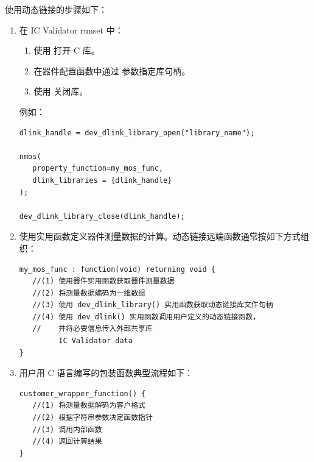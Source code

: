 使用动态链接的步骤如下：
\begin{enumerate}
  \item 在 IC Validator runset 中：
  \begin{enumerate}
    \item 使用  打开 C 库。
    \item 在器件配置函数中通过  参数指定库句柄。
    \item 使用  关闭库。
  \end{enumerate}
  例如：
\begin{lstlisting}[style=pxl]
dlink_handle = dev_dlink_library_open("library_name");

nmos(
   property_function=my_mos_func,
   dlink_libraries = {dlink_handle}
);

dev_dlink_library_close(dlink_handle);
\end{lstlisting}

  \item 使用实用函数定义器件测量数据的计算。动态链接远端函数通常按如下方式组织：
\begin{lstlisting}[style=pxl]
my_mos_func : function(void) returning void {
   //(1) 使用器件实用函数获取器件测量数据
   //(2) 将测量数据编码为一维数组
   //(3) 使用 dev_dlink_library() 实用函数获取动态链接库文件句柄
   //(4) 使用 dev_dlink() 实用函数调用用户定义的动态链接函数，
   //    并将必要信息传入外部共享库
         IC Validator data
}
\end{lstlisting}

  \item 用户用 C 语言编写的包装函数典型流程如下：
\begin{lstlisting}[style=pxl]
customer_wrapper_function() {
   //(1) 将测量数据解码为客户格式
   //(2) 根据字符串参数决定函数指针
   //(3) 调用内部函数
   //(4) 返回计算结果
}
\end{lstlisting}
\end{enumerate}
